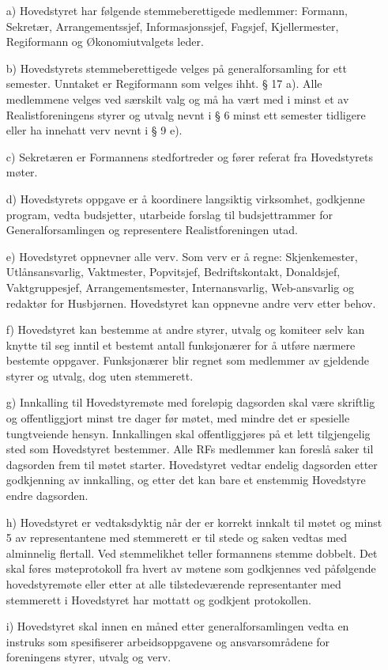 \begin{itemize}

\item[a)] Hovedstyret har følgende stemmeberettigede medlemmer: Formann,
Sekretær, Arrangementssjef, Informasjonssjef, Fagsjef, Kjellermester, Regiformann
og Økonomiutvalgets leder.

\item[b)] Hovedstyrets stemmeberettigede velges på generalforsamling for ett
semester. Unntaket er Regiformann som velges ihht. § 17 a).  Alle medlemmene velges ved særskilt valg og må ha vært med
i minst et av Realistforeningens styrer og utvalg nevnt i § 6 minst
ett semester tidligere eller ha innehatt verv nevnt i § 9 e).

\item[c)] Sekretæren er Formannens stedfortreder og fører referat fra
Hovedstyrets møter.

\item[d)] Hovedstyrets oppgave er å koordinere langsiktig virksomhet,
godkjenne program, vedta budsjetter, utarbeide forslag til budsjettrammer 
for Generalforsamlingen og representere Realistforeningen utad.

\item[e)] Hovedstyret oppnevner alle verv. Som verv er å regne:
Skjenkemester, Utlånsansvarlig, Vaktmester, Popvitsjef, Bedriftskontakt,
Donaldsjef, Vaktgruppesjef, Arrangementsmester, Internansvarlig,
Web-ansvarlig og redaktør for Husbjørnen. Hovedstyret kan oppnevne
andre verv etter behov.

\item[f)] Hovedstyret kan bestemme at andre styrer, utvalg og komiteer selv kan
knytte til seg inntil et bestemt antall funksjonærer for å utføre
nærmere bestemte oppgaver.  Funksjonærer blir regnet som medlemmer
av gjeldende styrer og utvalg, dog uten stemmerett.

\item[g)] Innkalling til Hovedstyremøte med foreløpig dagsorden skal være
skriftlig og offentliggjort minst tre dager før møtet, med mindre det
er spesielle tungtveiende hensyn. Innkallingen skal offentliggjøres på
et lett tilgjengelig sted som Hovedstyret bestemmer. Alle RFs
medlemmer kan foreslå saker til dagsorden frem til møtet starter.
Hovedstyret vedtar endelig dagsorden etter godkjenning av innkalling,
og etter det kan bare et enstemmig Hovedstyre endre dagsorden.

\item[h)] Hovedstyret er vedtaksdyktig når der er korrekt innkalt til møtet
og minst 5 av representantene med stemmerett er til stede og saken
vedtas med alminnelig flertall. Ved stemmelikhet teller formannens
stemme dobbelt. Det skal føres møteprotokoll fra hvert av møtene som
godkjennes ved påfølgende hovedstyremøte eller etter at alle
tilstedeværende representanter med stemmerett i Hovedstyret har
mottatt og godkjent protokollen.

\item[i)] Hovedstyret skal innen en måned etter generalforsamlingen vedta en
instruks som spesifiserer arbeidsoppgavene og ansvarsområdene for
foreningens styrer, utvalg og verv.

\end{itemize}


